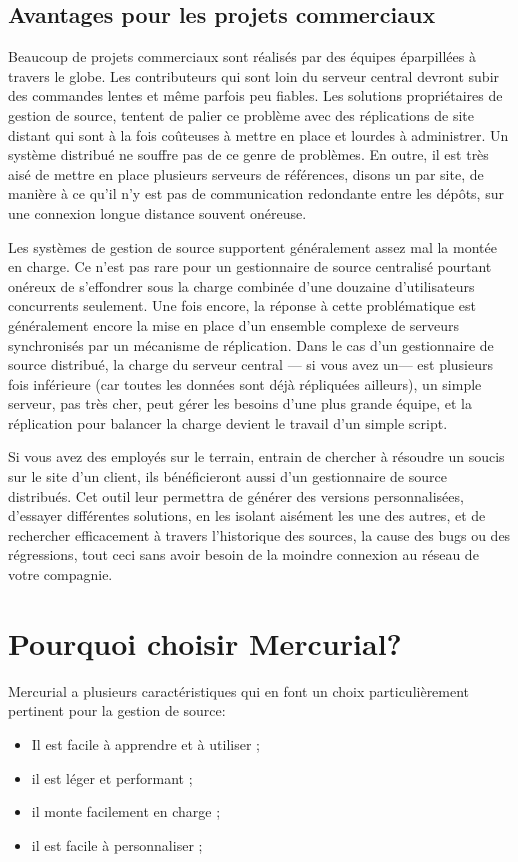 \subsection{Avantages pour les projets commerciaux}

Beaucoup de projets commerciaux sont réalisés par des équipes éparpillées
à travers le globe. Les contributeurs qui sont loin du serveur central
devront subir des commandes lentes et même parfois peu fiables. Les 
solutions propriétaires de gestion de source, tentent de palier ce problème 
avec des réplications de site distant qui sont à la fois coûteuses à mettre
en place et lourdes à administrer. Un système distribué ne souffre pas
de ce genre de problèmes. En outre, il est très aisé de mettre en place
plusieurs serveurs de références, disons un par site, de manière à ce qu'il
n'y est pas de communication redondante entre les dépôts, sur une connexion
longue distance souvent onéreuse.

Les systèmes de gestion de source supportent généralement assez mal la 
montée en charge. Ce n'est pas rare pour un gestionnaire de source centralisé 
pourtant onéreux de s'effondrer sous la charge combinée d'une douzaine 
d'utilisateurs concurrents seulement. Une fois encore, la réponse à cette problématique 
est généralement encore la mise en place d'un ensemble complexe de serveurs
synchronisés par un mécanisme de réplication. Dans le cas d'un gestionnaire
de source distribué, la charge du serveur central --- si vous avez un--- est
plusieurs fois inférieure (car toutes les données sont déjà répliquées ailleurs),
un simple serveur, pas très cher, peut gérer les besoins d'une plus grande
équipe, et la réplication pour balancer la charge devient le
travail d'un simple script.

Si vous avez des employés sur le terrain, entrain de chercher à résoudre un soucis sur
le site d'un client, ils bénéficieront aussi d'un gestionnaire de source
distribués. Cet outil leur permettra de générer des versions personnalisées,
d'essayer différentes solutions, en les isolant aisément les une des autres,
et de rechercher efficacement à travers l'historique des sources, la cause
des bugs ou des régressions, tout ceci sans avoir besoin de la moindre 
connexion au réseau de votre compagnie.

\section{Pourquoi choisir Mercurial?}

Mercurial a plusieurs caractéristiques qui en font un choix particulièrement
pertinent pour la gestion de source:
\begin{itemize}
	\item Il est facile à apprendre et à utiliser ;
	\item il est léger et performant ;
	\item il monte facilement en charge ; 
	\item il est facile à personnaliser ;
\end{itemize}

